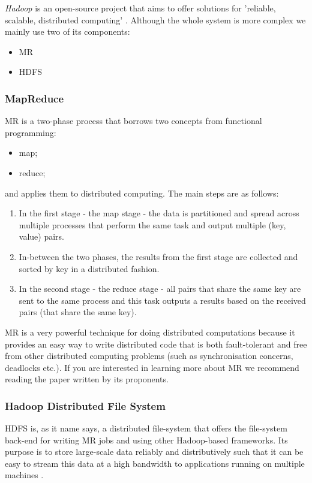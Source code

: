 \emph{Hadoop} is an open-source project that aims to offer solutions for
'reliable, scalable, distributed computing' .
Although the whole system is more complex we mainly use two of its components:
\begin{itemize}
  \item \acl{MR}
  \item \acl{HDFS}
\end{itemize}

\subsubsection{MapReduce}

\acf{MR} is a two-phase process that borrows two concepts from functional
programming:
\begin{itemize}
  \item map;
  \item reduce;
\end{itemize}
and applies them to distributed computing.
The main steps are as follows:
\begin{enumerate}
  \item In the first stage - the map stage - the data is partitioned and spread
  across multiple processes that perform the same task and output multiple
  (key, value) pairs.
  \item In-between the two phases, the results from the first stage are
  collected and sorted by key in a distributed fashion.
  \item In the second stage - the reduce stage - all pairs that share the same
  key are sent to the same process and this task outputs a results based on the
  received pairs (that share the same key).
\end{enumerate}
\acf{MR} is a very powerful technique for doing distributed computations
because it provides an easy way to write distributed code that is both
fault-tolerant and free from other distributed computing problems (such as
synchronisation concerns, deadlocks etc.).
If you are interested in learning more about \acf{MR} we recommend reading the
paper \cite{dean2008mapreduce} written by its proponents.

\subsubsection{Hadoop Distributed File System}

\acf{HDFS} is, as it name says, a distributed file-system that offers the
file-system back-end for writing \acl{MR} jobs and using other Hadoop-based
frameworks. Its purpose is to store large-scale data reliably and
distributively such that it can be easy to stream this data at a high bandwidth
to applications running on multiple machines \cite{shvachko2010hadoop}.

